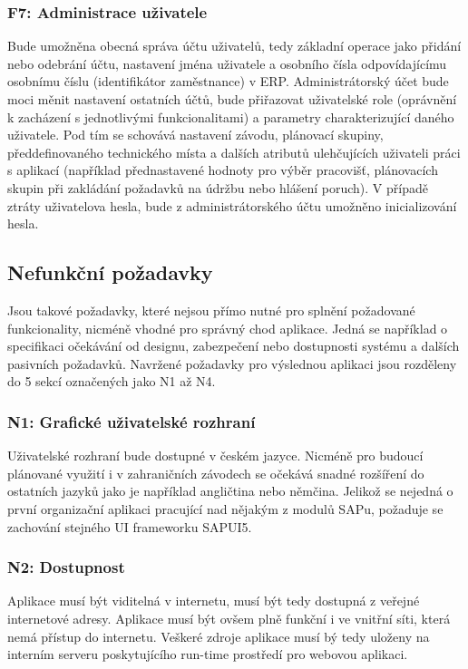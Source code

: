\documentclass[thesis=M,czech]{FITthesis}[2012/06/26]
\begin{document}
\subsubsection{F7: Administrace uživatele}
\label{sssec:fc_administrace}
Bude umožněna obecná správa účtu uživatelů, tedy základní operace jako přidání nebo odebrání účtu, nastavení jména uživatele a osobního čísla odpovídajícímu osobnímu číslu (identifikátor zaměstnance) v ERP. Administrátorský účet bude moci měnit nastavení ostatních účtů, bude přiřazovat uživatelské role (oprávnění k zacházení s jednotlivými funkcionalitami) a parametry charakterizující daného uživatele. Pod tím se schovává nastavení závodu, plánovací skupiny, předdefinovaného technického místa a dalších atributů ulehčujících uživateli práci s aplikací (například přednastavené hodnoty pro výběr pracovišť, plánovacích skupin při zakládání požadavků na údržbu nebo hlášení poruch). V případě ztráty uživatelova hesla, bude z administrátorského účtu umožněno inicializování hesla.

\subsection{Nefunkční požadavky}
Jsou takové požadavky, které nejsou přímo nutné pro splnění požadované funkcionality, nicméně vhodné pro správný chod aplikace. Jedná se například o specifikaci očekávání od designu, zabezpečení nebo dostupnosti systému a dalších pasivních požadavků. Navržené požadavky pro výslednou aplikaci jsou rozděleny do 5 sekcí označených jako N1 až N4.
\subsubsection{N1: Grafické uživatelské rozhraní}
Uživatelské rozhraní bude dostupné v českém jazyce. Nicméně pro budoucí plánované využití i v zahraničních závodech se očekává snadné rozšíření do ostatních jazyků jako je například angličtina nebo němčina. Jelikož se nejedná o první organizační aplikaci pracující nad nějakým z modulů SAPu, požaduje se zachování stejného UI frameworku SAPUI5.
\subsubsection{N2: Dostupnost}
Aplikace musí být viditelná v internetu, musí být tedy dostupná z veřejné internetové adresy. Aplikace musí být ovšem plně funkční i ve vnitřní síti, která nemá přístup do internetu. Veškeré zdroje aplikace musí bý tedy uloženy na interním serveru poskytujícího run-time prostředí pro webovou aplikaci.
\end{document}
